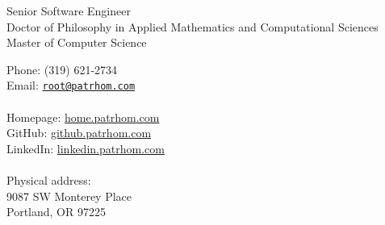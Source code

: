 \begin{minipage}[t]{0.5\textwidth}
  {\large Senior Software Engineer} \vspace{0.5em} \\
  \phantom{1} Doctor of Philosophy in Applied Mathematics and Computational Sciences  \vspace{0.5em} \\
  \phantom{1} Master of Computer Science\\
\end{minipage}
\hfill
\begin{minipage}[t]{0.4\textwidth}
  Phone: (319) 621-2734 \\
  Email: \href{mailto:root@patrhom.com}{\texttt{root@patrhom.com}} \\
  \\
  Homepage: \url{home.patrhom.com} \\
  GitHub: \url{github.patrhom.com} \\
  LinkedIn: \url{linkedin.patrhom.com} \\
  \\
  Physical address: \\
  9087 SW Monterey Place \\
  Portland, OR 97225
  
\end{minipage}

